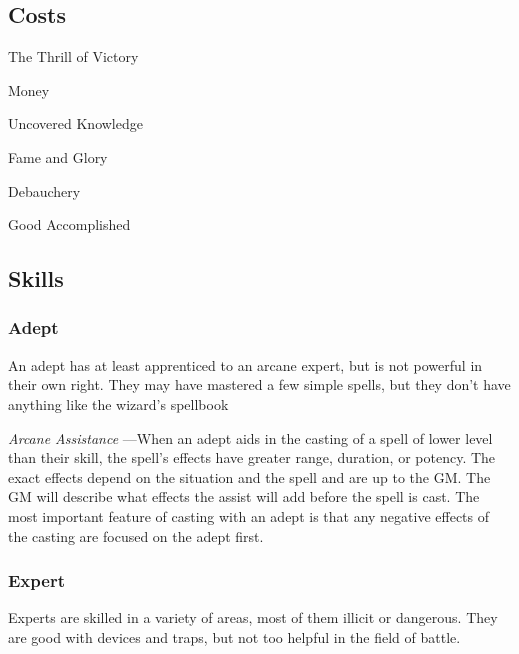  
\subsection{Costs}   
 
\startitemize[1,packed]

\item The Thrill of Victory

 
\item Money

 
\item Uncovered Knowledge

 
\item Fame and Glory

 
\item Debauchery

 
\item Good Accomplished


\stopitemize
 
\subsection{Skills}   
 
\subsubsection{Adept}   
 

An adept has at least apprenticed to an arcane expert, but is not powerful in their own right. They may have mastered a few simple spells, but they don't have anything like the wizard's spellbook

 

{\em Arcane Assistance} —When an adept aids in the casting of a spell of lower level than their skill, the spell's effects have greater range, duration, or potency. The exact effects depend on the situation and the spell and are up to the GM. The GM will describe what effects the assist will add before the spell is cast. The most important feature of casting with an adept is that any negative effects of the casting are focused on the adept first.

 
\subsubsection{Expert}   
 

Experts are skilled in a variety of areas, most of them illicit or dangerous. They are good with devices and traps, but not too helpful in the field of battle.

